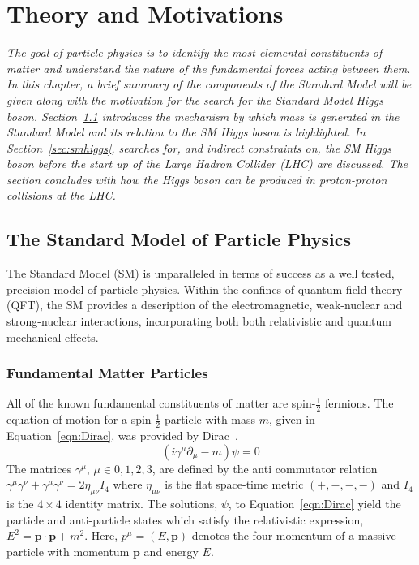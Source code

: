 \chapter{Theory and Motivations}
\label{chap:theory}

\emph{The goal of particle physics is to identify 
the most elemental constituents of matter and understand the nature of
the fundamental forces acting between them. In this chapter, a brief summary of 
the components of the Standard Model  will be given along with the motivation for
the search for the Standard Model Higgs boson. 
Section~\ref{sec:sm} introduces the mechanism by which mass is generated in the 
Standard Model and its relation to the SM Higgs boson is highlighted.
In Section~\ref{sec:smhiggs}, 
searches for, and indirect constraints on, the SM Higgs boson before the start up of 
the Large Hadron Collider (LHC) are discussed. The section concludes with 
how the Higgs boson can be produced in proton-proton collisions at the LHC.}

\section{The Standard Model of Particle Physics}
\label{sec:sm}

The Standard Model (SM) is unparalleled in terms of success as 
a well tested, precision model of particle physics. 
Within the confines of quantum field theory (QFT),  
the SM provides a description of the electromagnetic, weak-nuclear
and strong-nuclear interactions, incorporating both 
both relativistic and quantum mechanical effects.

\subsection{Fundamental Matter Particles}
All of the known fundamental constituents of matter
are spin-$\frac{1}{2}$ fermions. 
The equation of motion for a spin-$\frac{1}{2}$ particle with mass $m$, 
given in Equation~\ref{eqn:Dirac}, was provided by Dirac~\cite{wu}.
\begin{equation}
(i\gamma^{\mu}\partial_{\mu} - m)\psi = 0
\label{eqn:Dirac}
\end{equation}
The matrices $\gamma^{\mu}$, $\mu\in{0,1,2,3}$,  are
defined by the anti commutator relation 
$\gamma^{\mu}\gamma^{\nu}+\gamma^{\mu}\gamma^{\nu} = 2\eta_{\mu\nu}I_{4}$ where
$\eta_{\mu\nu}$ is the flat space-time metric $(+,-,-,-)$ and $I_{4}$ is the $4\times4$
identity matrix.
The solutions, $\psi$, to Equation~\ref{eqn:Dirac} yield the particle and anti-particle
states which satisfy the relativistic expression, 
$E^{2} = \mathbf{p}\cdot\mathbf{p} + m^{2}$. Here, $p^{\mu} = (E,\mathbf{p})$ 
denotes the four-momentum of a massive particle with momentum $\mathbf{p}$ and energy $E$.
 
